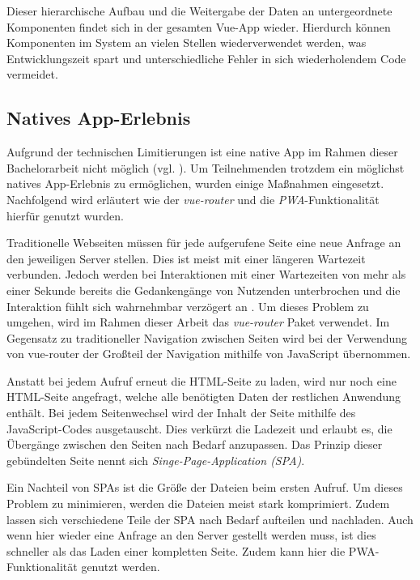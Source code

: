 Dieser hierarchische Aufbau und die Weitergabe der Daten an untergeordnete
Komponenten findet sich in der gesamten Vue-App wieder. Hierdurch können
Komponenten im System an vielen Stellen wiederverwendet werden, was
Entwicklungszeit spart und unterschiedliche Fehler in sich wiederholendem Code
vermeidet.

\subsection{Natives App-Erlebnis}

Aufgrund der technischen Limitierungen ist eine native App im Rahmen dieser
Bachelorarbeit nicht möglich (vgl. ). Um
Teilnehmenden trotzdem ein möglichst natives App-Erlebnis zu ermöglichen, wurden
einige Maßnahmen eingesetzt. Nachfolgend wird erläutert wie der
\textit{vue-router} und die \textit{PWA}-Funktionalität hierfür genutzt wurden.

Traditionelle Webseiten müssen für jede aufgerufene Seite eine neue Anfrage an
den jeweiligen Server stellen. Dies ist meist mit einer längeren Wartezeit
verbunden. Jedoch werden bei Interaktionen mit einer Wartezeiten von mehr als
einer Sekunde bereits die Gedankengänge von Nutzenden unterbrochen und die
Interaktion fühlt sich wahrnehmbar verzögert an \cite{Nielsen1994b}. Um dieses
Problem zu umgehen, wird im Rahmen dieser Arbeit das \textit{vue-router} Paket
verwendet. Im Gegensatz zu traditioneller Navigation zwischen Seiten wird bei
der Verwendung von vue-router der Großteil der Navigation mithilfe von
JavaScript übernommen.

Anstatt bei jedem Aufruf erneut die HTML-Seite zu laden, wird nur noch eine
HTML-Seite angefragt, welche alle benötigten Daten der restlichen Anwendung
enthält. Bei jedem Seitenwechsel wird der Inhalt der Seite mithilfe des
JavaScript-Codes ausgetauscht. Dies verkürzt die Ladezeit und erlaubt es, die
Übergänge zwischen den Seiten nach Bedarf anzupassen. Das Prinzip dieser
gebündelten Seite nennt sich \textit{Singe-Page-Application (SPA)}.

Ein Nachteil von SPAs ist die Größe der Dateien beim ersten Aufruf. Um dieses
Problem zu minimieren, werden die Dateien meist stark komprimiert. Zudem lassen
sich verschiedene Teile der SPA nach Bedarf aufteilen und nachladen. Auch wenn
hier wieder eine Anfrage an den Server gestellt werden muss, ist dies schneller
als das Laden einer kompletten Seite. Zudem kann hier die PWA-Funktionalität
genutzt werden.

